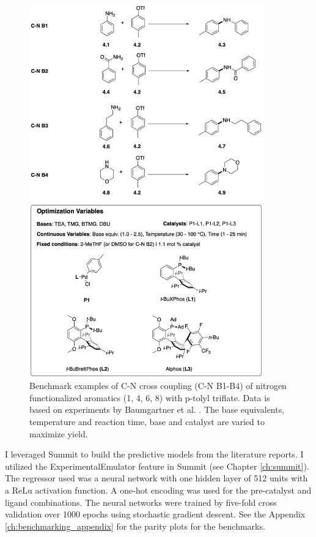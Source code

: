 \begin{figure}
    \centering
    \includegraphics[width=0.9\textwidth]{gfx/Chapter04/c_n_benchmarks_thesis.png}
    \caption{Benchmark examples of C-N cross coupling (C-N B1-B4) of nitrogen functionalized aromatics (1, 4, 6, 8) with p-tolyl triflate. Data is based on experiments by Baumgartner et al. 
 \cite{Baumgartner2019}. The base equivalents, temperature and reaction time, base and catalyst are varied to maximize yield.}
    \label{fig:benchmarks_cn}
\end{figure}

I leveraged Summit to build the predictive models from the literature reports. I utilized the ExperimentalEmulator feature in Summit (see Chapter \ref{ch:summit}). The regressor used was a neural network with one hidden layer of 512 units with a ReLu activation function. A one-hot encoding was used for the pre-catalyst and ligand combinations. The neural networks were trained by five-fold cross validation over 1000 epochs using stochastic gradient descent. See the Appendix \ref{ch:benchmarking_appendix} for the parity plots for the benchmarks. 

